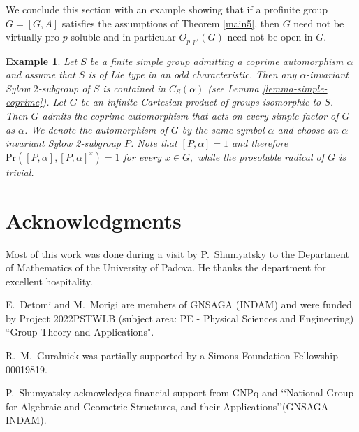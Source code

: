 \documentclass[12pt]{amsart}
\newtheorem{example}[theorem]{\sc Example}
\newcommand{\al }{\alpha }
\newcommand{\pr }{\mathrm{Pr} }
\begin{document}
We conclude this section with an example showing that if a profinite group $G=[G,A]$ satisfies the assumptions of Theorem \ref{main5}, then $G$ need not be virtually pro-$p$-soluble and in particular $O_{p,p'}(G)$ need not be open in $G$. 
 
 \begin{example}\label{remark}
{\rm Let $S$ be a finite simple group admitting a coprime automorphism $\al$ and assume that $S$ is of Lie type in an odd characteristic. 
   Then any $\alpha$-invariant Sylow $2$-subgroup of $S$ is contained in $C_S(\alpha)$ (see Lemma \ref{lemma-simple-coprime}). 
  Let $G$ be an infinite Cartesian product of groups isomorphic to $S$. Then $G$ admits the coprime automorphism that acts on every simple factor of $G$ as $\al$. We denote the automorphism of $G$ by the same symbol $\al$ and choose an $\al$-invariant Sylow 2-subgroup $P$. Note that $[P,\al]=1$ and therefore $\pr([P,\al],[P,\al]^x)=1$ for every $x\in G,$ while the prosoluble radical of $G$ is trivial.}
\end{example}

\section{Acknowledgments}
Most of this work was done during a visit by P.~Shumyatsky to the Department of Mathematics of the University of Padova. He thanks the department for excellent hospitality. 

E.~Detomi and M.~Morigi are members of GNSAGA (INDAM) and were funded by  Project 2022PSTWLB (subject area: PE - Physical Sciences and
Engineering) ``Group Theory and Applications". 

R.~M.~Guralnick was partially supported by a Simons Foundation Fellowship 00019819.

P.~Shumyatsky acknowledges financial support from CNPq and \lq\lq National Group for Algebraic and Geometric Structures, and their Applications\rq\rq (GNSAGA - INDAM).  
\end{document}
